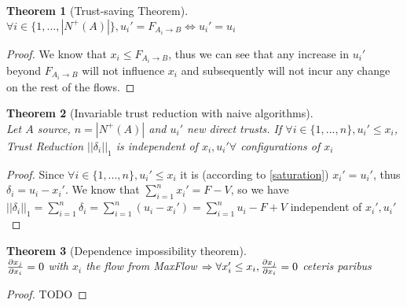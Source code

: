 \documentclass[11pt]{article}
\newtheorem{theorem}{Theorem}[section]
\theoremstyle{definition}
\theoremstyle{corollary}
\begin{document}
    \begin{theorem}[Trust-saving Theorem] \ \\
    \label{trustsave}
       $\forall i \in \{1,...,|N^{+}(A)|\}, u_i' = F_{A_i \rightarrow B} \Leftrightarrow u_i' = u_i$
    \end{theorem}
    \begin{proof}
       We know that $x_i \leq F_{A_i \rightarrow B}$, thus we can see that any increase in $u_i'$ beyond
       $F_{A_i \rightarrow B}$ will not influence $x_i$ and subsequently will not incur any change on the rest of the flows.
    \end{proof}

    \begin{theorem}[Invariable trust reduction with naive algorithms] \ \\
    \label{invariability}
       Let $A$ source, $n = |N^{+}(A)|$ and $u_i'$ new direct trusts. If $\forall i \in \{1,...,n\},u_i' \leq x_i$,
       Trust Reduction $||\delta_i||_1$ is independent of $x_i, u_i' $\newline $\forall$ configurations of $x_i$
    \end{theorem}
    \begin{proof} 
       Since $\forall i \in \{1,...,n\},u_i' \leq x_i$ it is (according to \ref{saturation}) $x_i' = u_i'$, thus $\delta_i = u_i
       - x_i'$. We know that $\sum\limits_{i=1}^{n}x_i' = F - V$, so we have $||\delta_i||_1 = \sum\limits_{i=1}^{n}\delta_i =
       \sum\limits_{i=1}^{n}(u_i - x_i') = \sum\limits_{i=1}^{n}u_i - F + V$ independent of $x_i', u_i'$
    \end{proof}

    \begin{theorem}[Dependence impossibility theorem] \ \\
    \label{independence}
       ${\partial x_j \over \partial x_i} = 0$ with $x_i$ the flow from MaxFlow $\Rightarrow
         \forall x_i' \leq x_i, {\partial x_j \over \partial x_i} = 0$ ceteris paribus
    \end{theorem}
    \begin{proof}
       TODO
    \end{proof}
\end{document}
